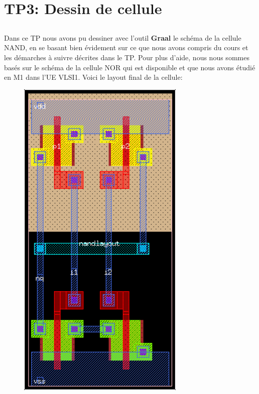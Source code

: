 \documentclass[12pt]{article}
\begin{document}
\section{TP3: Dessin de cellule}
\subsection*{}
Dans ce TP nous avons pu dessiner avec l'outil \textbf{Graal} le schéma de la cellule NAND, en se basant bien évidement sur ce que nous avons compris du cours et les démarches à suivre décrites dans le TP. Pour plus d’aide, nous nous sommes basés sur le schéma de la cellule NOR qui est disponible et que nous avons étudié en M1 dans l'UE VLSI1. Voici le layout final de la cellule:

\begin{figure}
\begin{center}
  \includegraphics[width = 8cm]{pic/nand.png}
\end{center}
\end{figure}
\end{document}
